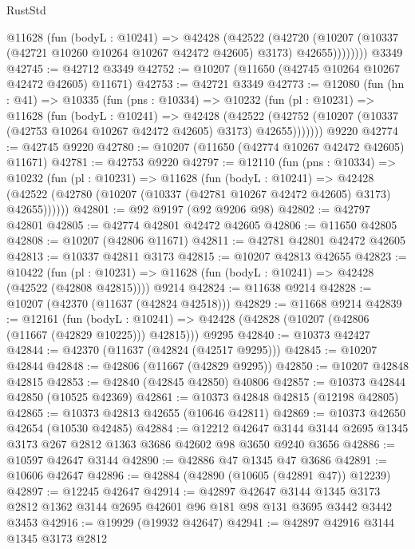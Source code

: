 \begin{lexlean}{RustStd}
\begin{coremodule}
          @11628
            (fun (bodyL : @10241) =>
            @42428
              (@42522
                (@42720
                  (@10207 (@10337 (@42721 @10260 @10264 @10267 @42472 @42605) @3173) @42655))))))))
    @3349
@42745 := @42712 @3349
@42752 := @10207 (@11650 (@42745 @10264 @10267 @42472 @42605) @11671)
@42753 := @42721 @3349
@42773 := @12080
    (fun (hn : @41) =>
    @10335
      (fun (pns : @10334) =>
      @10232
        (fun (pl : @10231) =>
        @11628
          (fun (bodyL : @10241) =>
          @42428
            (@42522
              (@42752 (@10207 (@10337 (@42753 @10264 @10267 @42472 @42605) @3173) @42655)))))))
    @9220
@42774 := @42745 @9220
@42780 := @10207 (@11650 (@42774 @10267 @42472 @42605) @11671)
@42781 := @42753 @9220
@42797 := @12110
    (fun (pns : @10334) =>
    @10232
      (fun (pl : @10231) =>
      @11628
        (fun (bodyL : @10241) =>
        @42428 (@42522 (@42780 (@10207 (@10337 (@42781 @10267 @42472 @42605) @3173) @42655))))))
@42801 := @92 @9197 (@92 @9206 @98)
@42802 := @42797 @42801
@42805 := @42774 @42801 @42472 @42605
@42806 := @11650 @42805
@42808 := @10207 (@42806 @11671)
@42811 := @42781 @42801 @42472 @42605
@42813 := @10337 @42811 @3173
@42815 := @10207 @42813 @42655
@42823 := @10422
    (fun (pl : @10231) => @11628 (fun (bodyL : @10241) => @42428 (@42522 (@42808 @42815))))
    @9214
@42824 := @11638 @9214
@42828 := @10207 (@42370 (@11637 (@42824 @42518)))
@42829 := @11668 @9214
@42839 := @12161
    (fun (bodyL : @10241) => @42428 (@42828 (@10207 (@42806 (@11667 (@42829 @10225))) @42815)))
    @9295
@42840 := @10373 @42427
@42844 := @42370 (@11637 (@42824 (@42517 @9295)))
@42845 := @10207 @42844
@42848 := @42806 (@11667 (@42829 @9295))
@42850 := @10207 @42848 @42815
@42853 := @42840 (@42845 @42850) @40806
@42857 := @10373 @42844 @42850 (@10525 @42369)
@42861 := @10373 @42848 @42815 (@12198 @42805)
@42865 := @10373 @42813 @42655 (@10646 @42811)
@42869 := @10373 @42650 @42654 (@10530 @42485)
@42884 := @12212
    @42647
    @3144
    @3144
    @2695
    @1345
    @3173
    @267
    @2812
    @1363
    @3686
    @42602
    @98
    @3650
    @9240
    @3656
@42886 := @10597 @42647 @3144
@42890 := @42886 @47 @1345 @47 @3686
@42891 := @10606 @42647
@42896 := @42884 (@42890 (@10605 (@42891 @47)) @12239)
@42897 := @12245 @42647
@42914 := @42897
    @42647
    @3144
    @1345
    @3173
    @2812
    @1362
    @3144
    @2695
    @42601
    @96
    @181
    @98
    @131
    @3695
    @3442
    @3442
    @3453
@42916 := @19929 (@19932 @42647)
@42941 := @42897
    @42916
    @3144
    @1345
    @3173
    @2812

\end{coremodule}
\end{lexlean}
